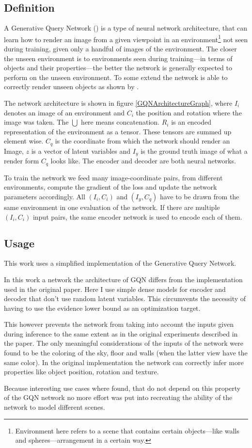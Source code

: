 \subsection{Definition}
A Generative Query Network (\cite{gqn}) is a type of neural network architecture, that can learn how to render an image from a given viewpoint in an environment\footnote{Environment here refers to a scene that contains certain objects---like walls and spheres---arrangement in a certain way.} not seen during training, given only a handful of images of the environment. The closer the unseen environment is to environments seen during training---in terms of objects and their properties---the better the network is generally expected to perform on the unseen environment. To some extend the network is able to correctly render unseen objects as shown by \cite{gqn}.

The network architecture is shown in figure \ref{GQNArchitectureGraph}, where $I_i$ denotes an image of an environment and $C_i$ the position and rotation where the image was taken. The $\bigcup$ here means concatenation. $R_i$ is an encoded representation of the environment as a tensor. These tensors are summed up element wise. $C_q$ is the coordinate from which the network should render an Image, $z$ is a vector of latent variables and $I_y$ is the ground truth image of what a render form $C_q$ looks like. The encoder and decoder are both neural networks.

To train the network we feed many image-coordinate pairs, from different environments, compute the gradient of the loss and update the network parameters accordingly. All $(I_i, C_i)$ and $(I_y, C_q)$ have to be drawn from the same environment in one evaluation of the network. If there are multiple $(I_i, C_i)$ input pairs, the same encoder network is used to encode each of them.

\GQNArchitectureGraph


\subsection{Usage}
This work uses a simplified implementation of the Generative Query Network.

In this work a network the architecture of GQN differs from the implementation used in the original paper. Here I use simple dense models for encoder and decoder that don't use random latent variables. This circumvents the necessity of having to use the evidence lower bound as an optimization target.

This however prevents the network from taking into account the inputs given during inference to the same extent as in the original experiments described in the paper. The only meaningful considerations of the inputs of the network were found to be the coloring of the sky, floor and walls (when the latter view have the same color). In the original implementation the network can correctly infer more properties like object position, rotation and texture.

Because interesting use cases where found, that do not depend on this property of the GQN network no more effort was put into recreating the ability of the network to model different scenes.

